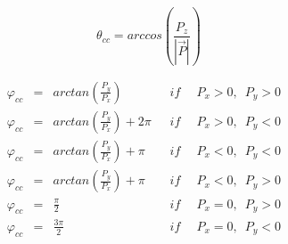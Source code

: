 \begin{equation}
 \theta_{cc}=arccos\left ( \frac{P_z}{\left | \overrightarrow{P} \right |}\right )
\label{eq:cc_theta} 
\end{equation}

\begin{equation}
\begin{aligned}
\varphi_{cc} & = & arctan\left ( \frac{P_{y}}{P_{x}} \right ) \, \, \, \, \, \,\, \, \, \, \, \, \, \, \, \, \, \, & if & \, \, \,  P_{x}>0,\, \, \, P_{y}>0 & \\
\varphi_{cc} & = & arctan\left ( \frac{P_{y}}{P_{x}} \right )+2\pi  \, \, \,  & if & \, \, \,  P_{x}>0,\, \, \, P_{y}<0 & \\
\varphi_{cc} & = & arctan\left ( \frac{P_{y}}{P_{x}} \right )+\pi  \, \, \, &  if & \, \, \,  P_{x}<0,\, \, \, P_{y}<0 & \\
\varphi_{cc} & = & arctan\left ( \frac{P_{y}}{P_{x}} \right )+\pi  \, \, \, &  if & \, \, \,  P_{x}<0,\, \, \, P_{y}>0 & \\
\varphi_{cc} & = & \frac{\pi }{2} \, \, \,  \, \, \,  \, \, \, \, \, \,   \, \, \,  \, \, \, \, \, \,& if & \, \, \,  P_{x}=0,\, \, \, P_{y}>0 & \\
\varphi_{cc} & = & \frac{3\pi }{2} \, \, \,  \, \, \, \, \, \,   \, \, \,  \, \, \, \, \, \,&  if & \, \, \,  P_{x}=0,\, \, \, P_{y}<0 & \\
\label{eq:phi_theta} 
\end{aligned}
\end{equation}



